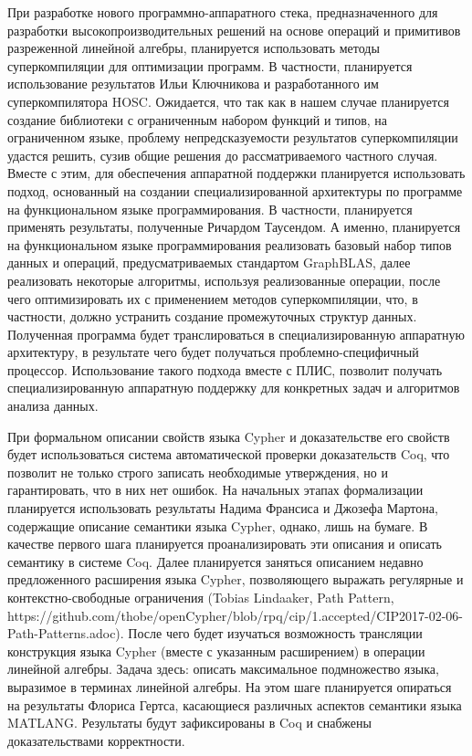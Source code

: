 \documentclass[12pt]{article}  %
\theoremstyle{remark}
\begin{document}
При разработке нового программно-аппаратного стека, предназначенного для разработки высокопроизводительных решений на основе операций и примитивов разреженной линейной алгебры, планируется использовать методы суперкомпиляции для оптимизации программ. В частности, планируется использование результатов Ильи Ключникова и разработанного им суперкомпилятора HOSC. Ожидается, что так как в нашем случае планируется создание библиотеки с ограниченным набором функций и типов, на ограниченном языке, проблему непредсказуемости результатов суперкомпиляции удастся решить, сузив общие решения до рассматриваемого частного случая. Вместе с этим, для обеспечения аппаратной поддержки планируется использовать подход, основанный на создании специализированной архитектуры по программе на функциональном языке программирования. В частности, планируется применять результаты, полученные Ричардом Таусендом. А именно, планируется на функциональном языке программирования реализовать базовый набор типов данных и операций, предусматриваемых стандартом GraphBLAS, далее реализовать некоторые алгоритмы, используя реализованные операции, после чего оптимизировать их с применением методов суперкомпиляции, что, в частности, должно устранить создание промежуточных структур данных. Полученная программа будет транслироваться в специализированную аппаратную архитектуру, в результате чего будет получаться проблемно-специфичный процессор. Использование такого подхода вместе с ПЛИС, позволит получать специализированную аппаратную поддержку для конкретных задач и алгоритмов анализа данных.

При формальном описании свойств языка Cypher и доказательстве его свойств будет использоваться система автоматической проверки доказательств Coq, что позволит не только строго записать необходимые утверждения, но и гарантировать, что в них нет ошибок. На начальных этапах формализации планируется использовать результаты Надима Франсиса и Джозефа Мартона, содержащие описание семантики языка Cypher, однако, лишь на бумаге. В качестве первого шага планируется проанализировать эти описания и описать семантику в системе Coq. Далее планируется заняться описанием недавно предложенного расширения языка Cypher, позволяющего выражать регулярные и контекстно-свободные ограничения (Tobias Lindaaker, Path Pattern, https://github.com/thobe/openCypher/blob/rpq/cip/1.accepted/CIP2017-02-06-Path-Patterns.adoc). После чего будет изучаться возможность трансляции конструкция языка Cypher (вместе с указанным расширением) в операции линейной алгебры. Задача здесь: описать максимальное подмножество языка, выразимое в терминах линейной алгебры. На этом шаге планируется опираться на результаты Флориса Гертса, касающиеся различных аспектов семантики языка MATLANG. Результаты будут зафиксированы в Coq и снабжены доказательствами корректности. 
\end{document}
